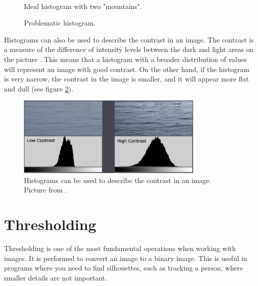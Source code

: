 \begin{figure}[htbp]
\begin{minipage}[b]{0.45\textwidth}
\end{minipage} \\ %
\begin{minipage}[t]{0.45\textwidth}
\caption{Ideal histogram with two "mountains".} %
\label{fig:SimpleThreshold}
\end{minipage} \hfill
\begin{minipage}[t]{0.45\textwidth}
\caption{Problematic histogram.} %
\label{fig:ComplicatedThreshold}
\end{minipage}
\end{figure}

Histograms can also be used to describe the contrast in an image. The contrast is a measure of the difference of intensity levels between the dark and light areas on the picture \citep{histogram}. This means that a histogram with a broader distribution of values will represent an image with good contrast. On the other hand, if the histogram is very narrow, the contrast in the image is smaller, and it will appear more flat and dull (see figure \ref{fig:histogram_contrast}).

\begin{figure}[htbp]
\centering
\includegraphics[width=0.80\textwidth]{Pictures/Theory/hisogram_contrast.png}
\caption{Histograms can be used to describe the contrast in an image. Picture from \citep{histogram}.}
\label{fig:histogram_contrast}
\end{figure}

\section{Thresholding}\label{sec:Thresholding}
Thresholding is one of the most fundamental operations when working with images. It is performed to convert an image to a binary image. This is useful in programs where you need to find silhouettes, such as tracking a person, where smaller details are not important.

